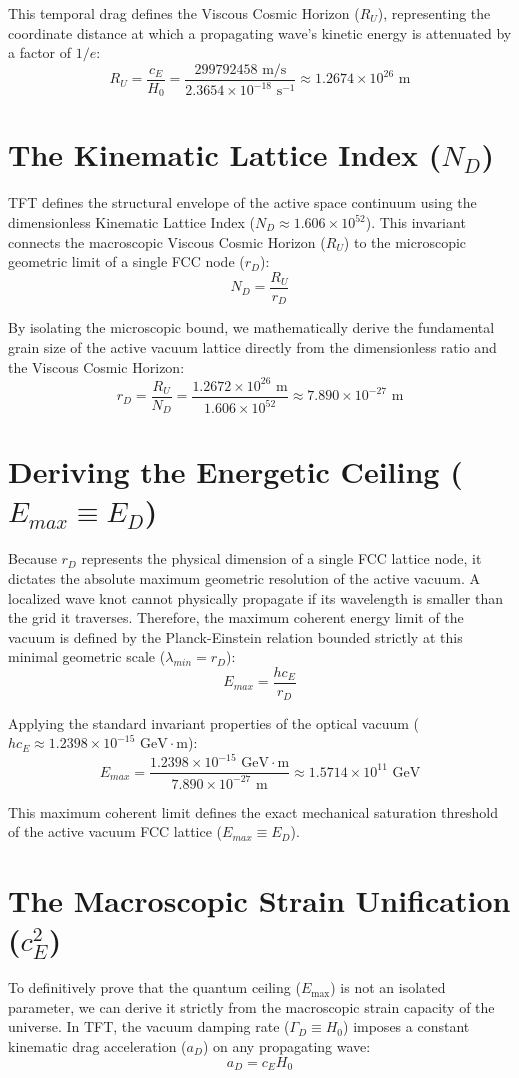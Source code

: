 This temporal drag defines the Viscous Cosmic Horizon ($R_U$), representing the coordinate distance at which a propagating wave's kinetic energy is attenuated by a factor of $1/e$:
\[
R_U = \frac{c_E}{H_0} = \frac{299792458 \text{ m/s}}{2.3654 \times 10^{-18} \text{ s}^{-1}} \approx 1.2674 \times 10^{26} \text{ m}
\]

\section{The Kinematic Lattice Index ($N_D$)}
TFT defines the structural envelope of the active space continuum using the dimensionless Kinematic Lattice Index ($N_D \approx 1.606 \times 10^{52}$). This invariant connects the macroscopic Viscous Cosmic Horizon ($R_U$) to the microscopic geometric limit of a single FCC node ($r_D$):
\[
N_D = \frac{R_U}{r_D}
\]

By isolating the microscopic bound, we mathematically derive the fundamental grain size of the active vacuum lattice directly from the dimensionless ratio and the Viscous Cosmic Horizon:
\[
r_D = \frac{R_U}{N_D} = \frac{1.2672 \times 10^{26} \text{ m}}{1.606 \times 10^{52}} \approx 7.890 \times 10^{-27} \text{ m}
\]

\section{Deriving the Energetic Ceiling ($E_{max} \equiv E_D$)}
Because $r_D$ represents the physical dimension of a single FCC lattice node, it dictates the absolute maximum geometric resolution of the active vacuum. A localized wave knot cannot physically propagate if its wavelength is smaller than the grid it traverses. Therefore, the maximum coherent energy limit of the vacuum is defined by the Planck-Einstein relation bounded strictly at this minimal geometric scale ($\lambda_{min} = r_D$):
\[
E_{max} = \frac{hc_E}{r_D}
\]

Applying the standard invariant properties of the optical vacuum ($hc_E \approx 1.2398 \times 10^{-15} \text{ GeV}\cdot\text{m}$):
\[
E_{max} = \frac{1.2398 \times 10^{-15} \text{ GeV}\cdot\text{m}}{7.890 \times 10^{-27} \text{ m}} \approx 1.5714 \times 10^{11} \text{ GeV}
\]

This maximum coherent limit defines the exact mechanical saturation threshold of the active vacuum FCC lattice ($E_{max} \equiv E_D$).

\section{The Macroscopic Strain Unification ($c_E^2$)}
To definitively prove that the quantum ceiling ($E_{\text{max}}$) is not an isolated parameter, we can derive it strictly from the macroscopic strain capacity of the universe. In TFT, the vacuum damping rate ($\Gamma_D \equiv H_0$) imposes a constant kinematic drag acceleration ($a_D$) on any propagating wave:
\[
a_D = c_E H_0
\]

